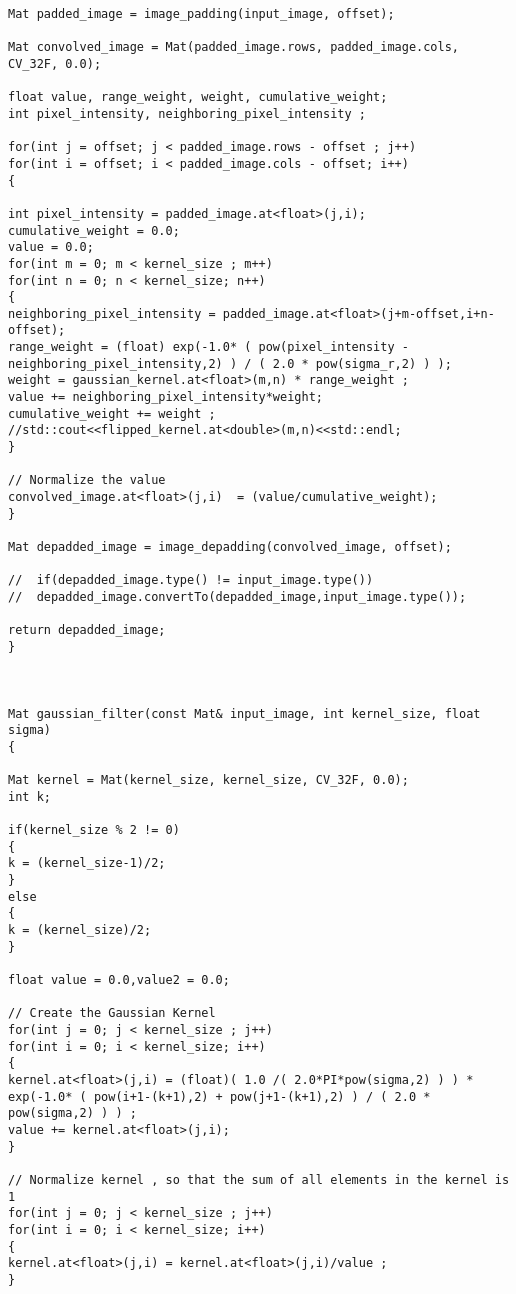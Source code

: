\begin{lstlisting}
Mat padded_image = image_padding(input_image, offset);

Mat convolved_image = Mat(padded_image.rows, padded_image.cols, CV_32F, 0.0);		

float value, range_weight, weight, cumulative_weight;
int pixel_intensity, neighboring_pixel_intensity ;

for(int j = offset; j < padded_image.rows - offset ; j++)
for(int i = offset; i < padded_image.cols - offset; i++)
{

int pixel_intensity = padded_image.at<float>(j,i);
cumulative_weight = 0.0;
value = 0.0;
for(int m = 0; m < kernel_size ; m++)
for(int n = 0; n < kernel_size; n++)
{
neighboring_pixel_intensity = padded_image.at<float>(j+m-offset,i+n-offset);
range_weight = (float) exp(-1.0* ( pow(pixel_intensity - neighboring_pixel_intensity,2) ) / ( 2.0 * pow(sigma_r,2) ) );
weight = gaussian_kernel.at<float>(m,n) * range_weight ;
value += neighboring_pixel_intensity*weight;
cumulative_weight += weight ;
//std::cout<<flipped_kernel.at<double>(m,n)<<std::endl;
}

// Normalize the value
convolved_image.at<float>(j,i)  = (value/cumulative_weight);	 
}

Mat depadded_image = image_depadding(convolved_image, offset);

//  if(depadded_image.type() != input_image.type())
//	depadded_image.convertTo(depadded_image,input_image.type());

return depadded_image;
}



Mat gaussian_filter(const Mat& input_image, int kernel_size, float sigma)
{

Mat kernel = Mat(kernel_size, kernel_size, CV_32F, 0.0);
int k;

if(kernel_size % 2 != 0)
{
k = (kernel_size-1)/2;
}
else
{
k = (kernel_size)/2;
}

float value = 0.0,value2 = 0.0;

// Create the Gaussian Kernel
for(int j = 0; j < kernel_size ; j++)
for(int i = 0; i < kernel_size; i++)
{
kernel.at<float>(j,i) = (float)( 1.0 /( 2.0*PI*pow(sigma,2) ) ) * exp(-1.0* ( pow(i+1-(k+1),2) + pow(j+1-(k+1),2) ) / ( 2.0 * pow(sigma,2) ) ) ;
value += kernel.at<float>(j,i);
}

// Normalize kernel , so that the sum of all elements in the kernel is 1
for(int j = 0; j < kernel_size ; j++)
for(int i = 0; i < kernel_size; i++)
{
kernel.at<float>(j,i) = kernel.at<float>(j,i)/value ;
}


\end{lstlisting}
